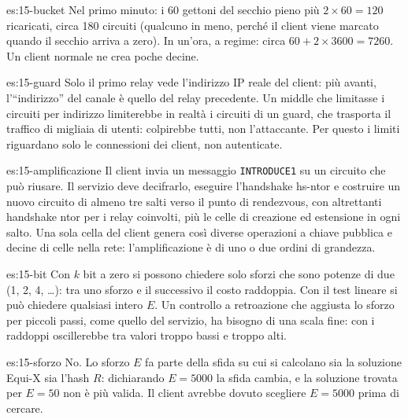 \begin{soluzione}{es:15-bucket}
Nel primo minuto: i 60 gettoni del secchio pieno più $2 \times 60 = 120$ ricaricati, circa 180 circuiti (qualcuno in meno, perché il client viene marcato quando il secchio arriva a zero). In un'ora, a regime: circa $60 + 2 \times 3600 = 7260$. Un client normale ne crea poche decine.
\end{soluzione}

\begin{soluzione}{es:15-guard}
Solo il primo relay vede l'indirizzo IP reale del client: più avanti, l'\enquote{indirizzo} del canale è quello del relay precedente. Un middle che limitasse i circuiti per indirizzo limiterebbe in realtà i circuiti di un guard, che trasporta il traffico di migliaia di utenti: colpirebbe tutti, non l'attaccante. Per questo i limiti riguardano solo le connessioni dei client, non autenticate.
\end{soluzione}

\begin{soluzione}{es:15-amplificazione}
Il client invia un messaggio \texttt{INTRODUCE1} su un circuito che può riusare. Il servizio deve decifrarlo, eseguire l'handshake hs-ntor e costruire un nuovo circuito di almeno tre salti verso il punto di rendezvous, con altrettanti handshake ntor per i relay coinvolti, più le celle di creazione ed estensione in ogni salto. Una sola cella del client genera così diverse operazioni a chiave pubblica e decine di celle nella rete: l'amplificazione è di uno o due ordini di grandezza.
\end{soluzione}

\begin{soluzione}{es:15-bit}
Con $k$ bit a zero si possono chiedere solo sforzi che sono potenze di due (1, 2, 4, \ldots): tra uno sforzo e il successivo il costo raddoppia. Con il test lineare si può chiedere qualsiasi intero $E$. Un controllo a retroazione che aggiusta lo sforzo per piccoli passi, come quello del servizio, ha bisogno di una scala fine: con i raddoppi oscillerebbe tra valori troppo bassi e troppo alti.
\end{soluzione}

\begin{soluzione}{es:15-sforzo}
No. Lo sforzo $E$ fa parte della sfida su cui si calcolano sia la soluzione Equi-X sia l'hash $R$: dichiarando $E = 5000$ la sfida cambia, e la soluzione trovata per $E = 50$ non è più valida. Il client avrebbe dovuto scegliere $E = 5000$ prima di cercare.
\end{soluzione}

